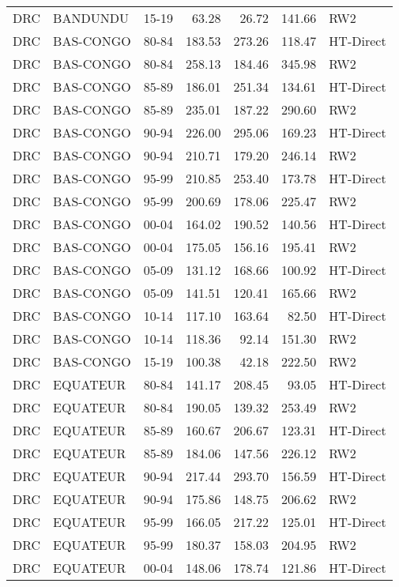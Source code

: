 \begin{longtable}{lllrrrl}
  DRC & BANDUNDU & 15-19 & 63.28 & 26.72 & 141.66 & RW2 \\ 
  DRC & BAS-CONGO & 80-84 & 183.53 & 273.26 & 118.47 & HT-Direct \\ 
  DRC & BAS-CONGO & 80-84 & 258.13 & 184.46 & 345.98 & RW2 \\ 
  DRC & BAS-CONGO & 85-89 & 186.01 & 251.34 & 134.61 & HT-Direct \\ 
  DRC & BAS-CONGO & 85-89 & 235.01 & 187.22 & 290.60 & RW2 \\ 
  DRC & BAS-CONGO & 90-94 & 226.00 & 295.06 & 169.23 & HT-Direct \\ 
  DRC & BAS-CONGO & 90-94 & 210.71 & 179.20 & 246.14 & RW2 \\ 
  DRC & BAS-CONGO & 95-99 & 210.85 & 253.40 & 173.78 & HT-Direct \\ 
  DRC & BAS-CONGO & 95-99 & 200.69 & 178.06 & 225.47 & RW2 \\ 
  DRC & BAS-CONGO & 00-04 & 164.02 & 190.52 & 140.56 & HT-Direct \\ 
  DRC & BAS-CONGO & 00-04 & 175.05 & 156.16 & 195.41 & RW2 \\ 
  DRC & BAS-CONGO & 05-09 & 131.12 & 168.66 & 100.92 & HT-Direct \\ 
  DRC & BAS-CONGO & 05-09 & 141.51 & 120.41 & 165.66 & RW2 \\ 
  DRC & BAS-CONGO & 10-14 & 117.10 & 163.64 & 82.50 & HT-Direct \\ 
  DRC & BAS-CONGO & 10-14 & 118.36 & 92.14 & 151.30 & RW2 \\ 
  DRC & BAS-CONGO & 15-19 & 100.38 & 42.18 & 222.50 & RW2 \\ 
  DRC & EQUATEUR & 80-84 & 141.17 & 208.45 & 93.05 & HT-Direct \\ 
  DRC & EQUATEUR & 80-84 & 190.05 & 139.32 & 253.49 & RW2 \\ 
  DRC & EQUATEUR & 85-89 & 160.67 & 206.67 & 123.31 & HT-Direct \\ 
  DRC & EQUATEUR & 85-89 & 184.06 & 147.56 & 226.12 & RW2 \\ 
  DRC & EQUATEUR & 90-94 & 217.44 & 293.70 & 156.59 & HT-Direct \\ 
  DRC & EQUATEUR & 90-94 & 175.86 & 148.75 & 206.62 & RW2 \\ 
  DRC & EQUATEUR & 95-99 & 166.05 & 217.22 & 125.01 & HT-Direct \\ 
  DRC & EQUATEUR & 95-99 & 180.37 & 158.03 & 204.95 & RW2 \\ 
  DRC & EQUATEUR & 00-04 & 148.06 & 178.74 & 121.86 & HT-Direct \\ 

\end{longtable}
